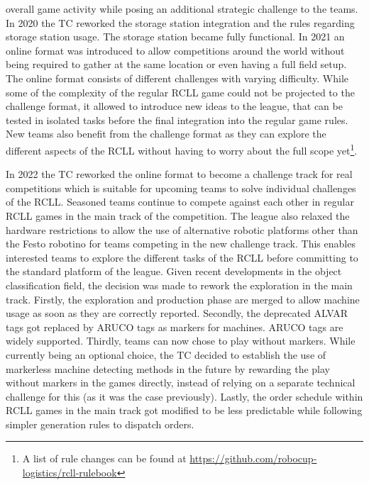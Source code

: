 \documentclass[12pt,twoside]{article}
\begin{document}
 overall game activity while posing an additional strategic challenge to the
 teams.
 In 2020 the \ac{TC} reworked the storage station integration and the rules
 regarding storage station usage. The storage station became fully functional.
 In 2021 an online format was introduced to allow competitions around the
 world without being required to gather at the same location or even having
 a full field setup.
 The online format consists of different challenges with varying difficulty.
 While some of the complexity of the regular \ac{RCLL} game could not be
 projected to the challenge format,
 it allowed to introduce new ideas to the league,
 that can be tested in isolated tasks before the final integration into
 the regular game rules.
 New teams also benefit from the challenge format as they can explore the
 different aspects of the \ac{RCLL} without having to worry about the full scope
 yet\footnote{A list of rule changes can be found at
 \mbox{\url{https://github.com/robocup-logistics/rcll-rulebook}}}.

 In 2022 the \ac{TC} reworked the online format to become a challenge track
 for real competitions which is suitable for upcoming teams to solve individual
 challenges of the \ac{RCLL}.
 Seasoned teams continue to compete against each other in regular \ac{RCLL}
 games in the main track of the competition.
 The league also relaxed the hardware restrictions to allow the use of
 alternative robotic platforms other than the Festo robotino for
 teams competing in the new challenge track.
 This enables interested teams to explore the different tasks of the \ac{RCLL}
 before committing to the standard platform of the league.
 Given recent developments in the object classification field, the
 decision was made to rework the exploration in the main track.
 Firstly, the exploration and production phase are merged to allow machine
 usage as soon as they are correctly reported.
 Secondly, the deprecated ALVAR tags got replaced by ARUCO tags as markers
 for machines. ARUCO tags are widely supported.
 Thirdly, teams can now chose to play without markers.
 While currently being an optional choice, the \ac{TC} decided to establish
 the use of markerless machine detecting methods in the future by rewarding
 the play without markers in the games directly, instead of relying on a
 separate technical challenge for this (as it was the case previously).
 Lastly, the order schedule within \ac{RCLL} games in the main track got
 modified to be less predictable while following simpler generation rules to
 dispatch orders.
\end{document}
